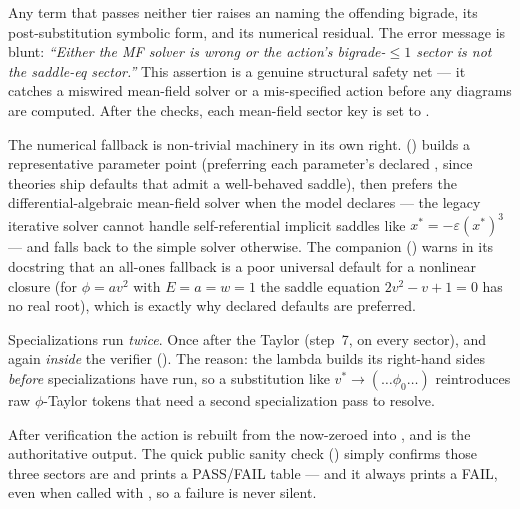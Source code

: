 Any term that passes neither tier raises an  naming the
offending bigrade, its post-substitution symbolic form, and its numerical residual.
The error message is blunt: \emph{``Either the MF solver is wrong or the action's
bigrade-$\le 1$ sector is not the saddle-eq sector.''} This assertion is a genuine
structural safety net --- it catches a miswired mean-field solver or a mis-specified
action before any diagrams are computed. After the checks, each mean-field sector
key is set to .

\begin{note}
The numerical fallback is non-trivial machinery in its own right.
 () builds a representative
parameter point (preferring each parameter's declared , since theories
ship defaults that admit a well-behaved saddle), then prefers the differential-algebraic
mean-field solver when the model declares  --- the legacy iterative
solver cannot handle self-referential implicit saddles like
$x^{*}=-\varepsilon (x^{*})^3$ --- and falls back to the simple solver otherwise. The
companion  () warns in
its docstring that an all-ones fallback is a poor universal default for a nonlinear
closure (for $\phi=av^2$ with $E=a=w=1$ the saddle equation $2v^2-v+1=0$ has no real
root), which is exactly why declared defaults are preferred.
\end{note}

\begin{gotcha}
Specializations run \emph{twice}. Once after the Taylor (step~7, on every sector),
and again \emph{inside} the verifier (). The reason: the
 lambda builds its right-hand sides \emph{before} specializations have
run, so a substitution like $v^{*}\to(\dots\phi_0\dots)$ reintroduces raw
$\phi$-Taylor tokens that need a second specialization pass to resolve.
\end{gotcha}

After verification the action is rebuilt from the now-zeroed  into
, and  is the authoritative output. The quick
public sanity check  () simply
confirms those three sectors are  and prints a PASS/FAIL table --- and
it always prints a FAIL, even when called with , so a failure is
never silent.

